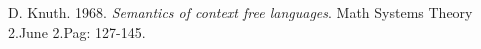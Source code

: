 \documentclass[runningheads,a4paper]{llncs}
\newcommand{\urllink}[1]{\htmladdnormallink{#1}{#1}}
\begin{document}
\begin{thebibliography}{10}

 D. Knuth. 1968. \textit{Semantics of context free languages}. Math Systems Theory 2.June 2.Pag: 127-145.

 
% 




 
\end{thebibliography}
\end{document}
